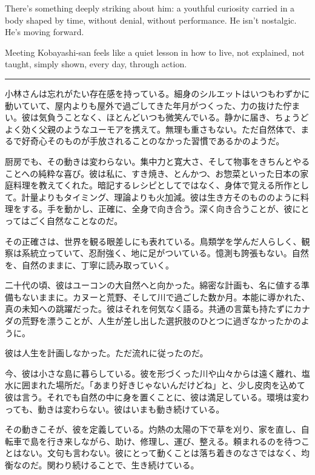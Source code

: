 \documentclass[
  letterpaper,
  oneside]{scrbook}
\begin{document}
There's something deeply striking about him: a youthful curiosity
carried in a body shaped by time, without denial, without performance.
He isn't nostalgic. He's moving forward.

Meeting Kobayashi-san feels like a quiet lesson in how to live, not
explained, not taught, simply shown, every day, through action.

\begin{center}\rule{0.5\linewidth}{0.5pt}\end{center}

小林さんは忘れがたい存在感を持っている。細身のシルエットはいつもわずかに動いていて、屋内よりも屋外で過ごしてきた年月がつくった、力の抜けた佇まい。彼は気負うことなく、ほとんどいつも微笑んでいる。静かに届き、ちょうどよく効く父親のようなユーモアを携えて。無理も重さもない。ただ自然体で、まるで好奇心そのものが手放されることのなかった習慣であるかのようだ。

厨房でも、その動きは変わらない。集中力と寛大さ、そして物事をきちんとやることへの純粋な喜び。彼は私に、すき焼き、とんかつ、お惣菜といった日本の家庭料理を教えてくれた。暗記するレシピとしてではなく、身体で覚える所作として。計量よりもタイミング、理論よりも火加減。彼は生き方そのもののように料理をする。手を動かし、正確に、全身で向き合う。深く向き合うことが、彼にとってはごく自然なことなのだ。

その正確さは、世界を観る眼差しにも表れている。鳥類学を学んだ人らしく、観察は系統立っていて、忍耐強く、地に足がついている。憶測も誇張もない。自然を、自然のままに、丁寧に読み取っていく。

二十代の頃、彼はユーコンの大自然へと向かった。綿密な計画も、名に値する準備もないままに。カヌーと荒野、そして川で過ごした数か月。本能に導かれた、真の未知への跳躍だった。彼はそれを何気なく語る。共通の言葉も持たずにカナダの荒野を漂うことが、人生が差し出した選択肢のひとつに過ぎなかったかのように。

彼は人生を計画しなかった。ただ流れに従ったのだ。

今、彼は小さな島に暮らしている。彼を形づくった川や山々からは遠く離れ、塩水に囲まれた場所だ。「あまり好きじゃないんだけどね」と、少し皮肉を込めて彼は言う。それでも自然の中に身を置くことに、彼は満足している。環境は変わっても、動きは変わらない。彼はいまも動き続けている。

その動きこそが、彼を定義している。灼熱の太陽の下で草を刈り、家を直し、自転車で島を行き来しながら、助け、修理し、運び、整える。頼まれるのを待つことはない。文句も言わない。彼にとって動くことは落ち着きのなさではなく、均衡なのだ。関わり続けることで、生き続けている。
\end{document}
